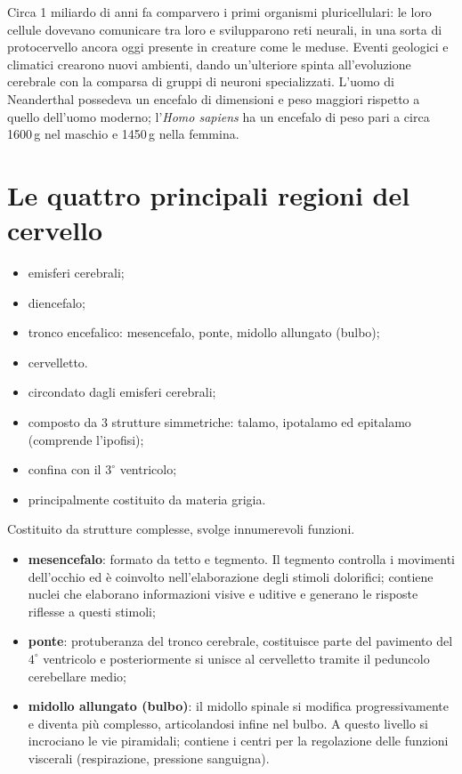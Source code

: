 Circa 1 miliardo di anni fa comparvero i primi organismi pluricellulari: le
loro cellule dovevano comunicare tra loro e svilupparono reti neurali, in una
sorta di protocervello ancora oggi presente in creature come le meduse.
Eventi geologici e climatici crearono nuovi ambienti, dando un'ulteriore
spinta all'evoluzione cerebrale con la comparsa di gruppi di neuroni
specializzati. L'uomo di Neanderthal possedeva un encefalo di dimensioni e
peso maggiori rispetto a quello dell'uomo moderno; l'\textit{Homo sapiens}
ha un encefalo di peso pari a circa 1600\,g nel maschio e 1450\,g nella
femmina.

\section{Le quattro principali regioni del cervello}

\begin{itemize}
  \item emisferi cerebrali;
  \item diencefalo;
  \item tronco encefalico: mesencefalo, ponte, midollo allungato (bulbo);
  \item cervelletto.
\end{itemize}

\begin{itemize}
  \item circondato dagli emisferi cerebrali;
  \item composto da 3 strutture simmetriche: talamo, ipotalamo ed epitalamo
    (comprende l'ipofisi);
  \item confina con il $3^\circ$ ventricolo;
  \item principalmente costituito da materia grigia.
\end{itemize}

Costituito da strutture complesse, svolge innumerevoli funzioni.
\begin{itemize}
  \item \textbf{mesencefalo}: formato da tetto e tegmento. Il tegmento
    controlla i movimenti dell'occhio ed è coinvolto nell'elaborazione degli
    stimoli dolorifici; contiene nuclei che elaborano informazioni visive e
    uditive e generano le risposte riflesse a questi stimoli;
  \item \textbf{ponte}: protuberanza del tronco cerebrale, costituisce parte
    del pavimento del $4^\circ$ ventricolo e posteriormente si unisce al
    cervelletto tramite il peduncolo cerebellare medio;
  \item \textbf{midollo allungato (bulbo)}: il midollo spinale si modifica
    progressivamente e diventa più complesso, articolandosi infine nel bulbo.
    A questo livello si incrociano le vie piramidali; contiene i centri per
    la regolazione delle funzioni viscerali (respirazione, pressione
    sanguigna).
\end{itemize}

